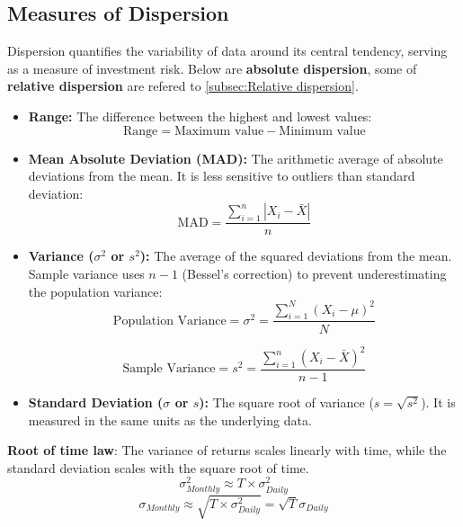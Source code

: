 \subsection{Measures of Dispersion}
	\label{subsec:Measures of Dispersion}
Dispersion quantifies the variability of data around its central tendency, serving as a measure of investment risk.
Below are \textbf{absolute dispersion}, some of \textbf{relative dispersion} are refered to \ref{subsec:Relative dispersion}.
\begin{itemize}
	\item \textbf{Range:} The difference between the highest and lowest values:
	\begin{equation}
		\text{Range} = \text{Maximum value} - \text{Minimum value}
		\label{eq:range_formula_m5}
	\end{equation}
	
	\item \textbf{Mean Absolute Deviation (MAD):} The arithmetic average of absolute deviations from the mean. It is less sensitive to outliers than standard deviation:
	\begin{equation}
		\text{MAD} = \frac{\sum_{i=1}^{n} |X_i - \bar{X}|}{n}
		\label{eq:mad_formula_m5}
	\end{equation}

	\item \textbf{Variance ($\sigma^2$ or $s^2$):} The average of the squared deviations from the mean. Sample variance uses $n - 1$ (Bessel's correction) to prevent underestimating the population variance:
	\begin{equation}
		\text{Population Variance} = \sigma^2 = \frac{\sum_{i=1}^{N} (X_i - \mu)^2}{N}
		\label{eq:pop_variance_m5}
	\end{equation}
	
	\begin{equation}
		\text{Sample Variance} = s^2 = \frac{\sum_{i=1}^{n} (X_i - \bar{X})^2}{n - 1}
		\label{eq:sample_variance_m5}
	\end{equation}

	\item \textbf{Standard Deviation ($\sigma$ or $s$):} The square root of variance ($s = \sqrt{s^2}$). It is measured in the same units as the underlying data.
\end{itemize}
\textbf{Root of time law}: The variance of returns scales linearly with time, while the standard deviation scales with the square root of time.
\[\sigma^2_{Monthly} \approx T \times \sigma^2_{Daily}\]
\[\sigma_{Monthly} \approx \sqrt{T \times \sigma^2_{Daily}} = \sqrt{T}\sigma_{Daily}\]

